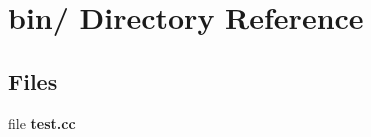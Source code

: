 \section{bin/ Directory Reference}
\label{dir_9b01cdaa26f12e8d58db3941377b2934}
\subsection*{Files}
\begin{DoxyCompactItemize}
\item 
file {\bf test.cc}
\end{DoxyCompactItemize}
